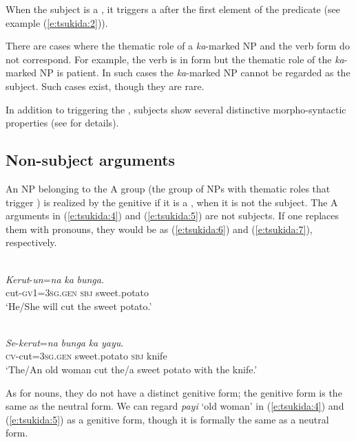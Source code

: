 \documentclass[output=paper
,modfonts
,nonflat]{langsci/langscibook}
\begin{document}
When the subject is a , it triggers a   after the first element of the predicate (see example (\ref{e:tsukida:2})). 

There are cases where the thematic role of a \textit{ka}-marked NP and the verb form do not correspond. For example, the verb is in  form but the thematic role of the \textit{ka}-marked NP is patient. In such cases the \textit{ka}-marked NP cannot be regarded as the subject. Such cases exist, though they are rare.

In addition to triggering the  , subjects show several distinctive morpho-syntactic properties (see \citealt{Tsukida2009} for details). 

\subsection{\label{s:tsukida:1.3}Non-subject arguments}

An NP belonging to the A group (the group of NPs with thematic roles that trigger ) is realized by the genitive  if it is a , when it is not the subject. The A arguments in (\ref{e:tsukida:4}) and (\ref{e:tsukida:5}) are not subjects. If one replaces them with pronouns, they would be as (\ref{e:tsukida:6}) and (\ref{e:tsukida:7}), respectively.

\begin{exe}
	\label{e:tsukida:6}\\
	\gll \textit{Kerut}-\textit{un}=\textit{na} \textit{ka} \textit{bunga}.\\
	cut-\textsc{gv1}=\textsc{3sg.gen}  \textsc{sbj} sweet.potato\\
	\glt ‘He/She will cut the sweet potato.’
\end{exe}

\begin{exe}
	\label{e:tsukida:7}\\
	\gll \textit{Se}-\textit{kerut}=\textit{na} \textit{bunga} \textit{ka} \textit{yayu}.\\
	\textsc{cv}-cut=\textsc{3sg.gen} sweet.potato \textsc{sbj} knife\\
	\glt ‘The/An old woman cut the/a sweet potato with the knife.’
\end{exe}

\noindent
As for nouns, they do not have a distinct genitive form; the genitive form is the same as the neutral form. We can regard \textit{payi} ‘old woman’ in (\ref{e:tsukida:4}) and (\ref{e:tsukida:5}) as a genitive form, though it is formally the same as a neutral form. 
\end{document}
